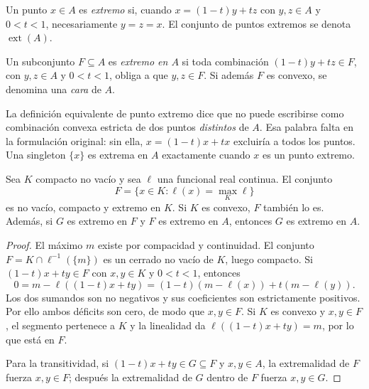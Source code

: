 \begin{definicion}
Un punto $x\in A$ es \emph{extremo} si, cuando $x=(1-t)y+tz$ con $y,z\in A$ y $0<t<1$, necesariamente $y=z=x$. El conjunto de puntos extremos se denota $\operatorname{ext}(A)$.

Un subconjunto $F\subseteq A$ es \emph{extremo en $A$} si toda combinación $(1-t)y+tz\in F$, con $y,z\in A$ y $0<t<1$, obliga a que $y,z\in F$. Si además $F$ es convexo, se denomina una \emph{cara} de $A$.
\end{definicion}

La definición equivalente de punto extremo dice que no puede escribirse como combinación convexa estricta de dos puntos \emph{distintos} de $A$. Esa palabra falta en la formulación original: sin ella, $x=(1-t)x+tx$ excluiría a todos los puntos. Una singleton $\{x\}$ es extrema en $A$ exactamente cuando $x$ es un punto extremo.

\begin{lema}\label{ch24:caras}
Sea $K$ compacto no vacío y sea $\ell$ una funcional real continua. El conjunto
\[
 F=\{x\in K:\ell(x)=\max_K\ell\}
\]
es no vacío, compacto y extremo en $K$. Si $K$ es convexo, $F$ también lo es. Además, si $G$ es extremo en $F$ y $F$ es extremo en $A$, entonces $G$ es extremo en $A$.
\end{lema}
\begin{proof}
El máximo $m$ existe por compacidad y continuidad. El conjunto $F=K\cap\ell^{-1}(\{m\})$ es un cerrado no vacío de $K$, luego compacto. Si $(1-t)x+ty\in F$ con $x,y\in K$ y $0<t<1$, entonces
\[
 0=m-\ell((1-t)x+ty)
 =(1-t)(m-\ell(x))+t(m-\ell(y)).
\]
Los dos sumandos son no negativos y sus coeficientes son estrictamente positivos. Por ello ambos déficits son cero, de modo que $x,y\in F$. Si $K$ es convexo y $x,y\in F$, el segmento pertenece a $K$ y la linealidad da $\ell((1-t)x+ty)=m$, por lo que está en $F$.

Para la transitividad, si $(1-t)x+ty\in G\subseteq F$ y $x,y\in A$, la extremalidad de $F$ fuerza $x,y\in F$; después la extremalidad de $G$ dentro de $F$ fuerza $x,y\in G$.
\end{proof}

